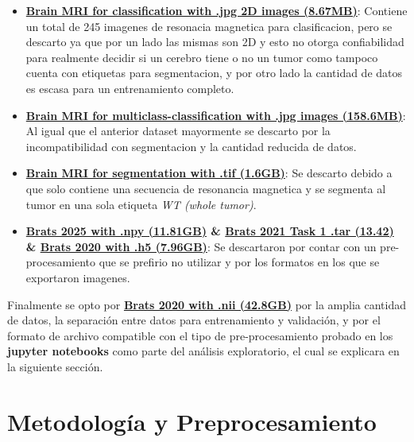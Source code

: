 \begin{itemize}
    \item \textbf{\href{https://www.kaggle.com/datasets/navoneel/brain-mri-images-for-brain-tumor-detection}{Brain MRI for classification with .jpg 2D images (8.67MB)}}: Contiene un total de 245 imagenes de resonacia magnetica para clasificacion, pero se descarto ya que por un lado las mismas son 2D y esto no otorga confiabilidad para realmente decidir si un cerebro tiene o no un tumor como tampoco cuenta con etiquetas para segmentacion, y por otro lado la cantidad de datos es escasa para un entrenamiento completo.
    \item \textbf{\href{https://www.kaggle.com/datasets/masoudnickparvar/brain-tumor-mri-dataset/data}{Brain MRI for multiclass-classification with .jpg images (158.6MB)}}: Al igual que el anterior dataset mayormente se descarto por la incompatibilidad con segmentacion y la cantidad reducida de datos.
    \item \textbf{\href{https://www.kaggle.com/datasets/mateuszbuda/lgg-mri-segmentation/data}{Brain MRI for segmentation with .tif (1.6GB)}}: Se descarto debido a que solo contiene una secuencia de resonancia magnetica y se segmenta al tumor en una sola etiqueta \textit{WT (whole tumor)}.
    \item \textbf{\href{https://www.kaggle.com/datasets/patiencebwire/brats-2025}{Brats 2025 with .npy (11.81GB)} \& \href{https://www.kaggle.com/datasets/dschettler8845/brats-2021-task1}{Brats 2021 Task 1 .tar (13.42)} \& \href{https://www.kaggle.com/datasets/awsaf49/brats2020-training-data}{Brats 2020 with .h5 (7.96GB)}}: Se descartaron por contar con un pre-procesamiento que se prefirio no utilizar y por los formatos en los que se exportaron imagenes.
\end{itemize}

Finalmente se opto por \textbf{\href{https://www.kaggle.com/datasets/awsaf49/brats20-dataset-training-validation}{Brats 2020 with .nii (42.8GB)}} por la amplia cantidad de datos, la separación entre datos para entrenamiento y validación, y por el formato de archivo compatible con el tipo de pre-procesamiento probado en los \textbf{jupyter notebooks} como parte del análisis exploratorio, el cual se explicara en la siguiente sección.

\section{Metodología y Preprocesamiento}

